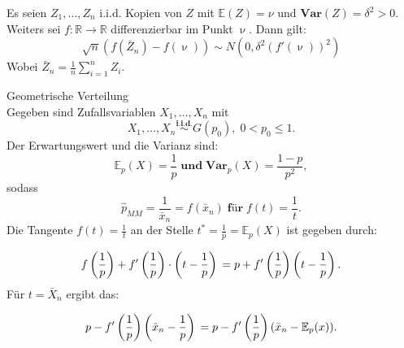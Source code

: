 \documentclass[10pt]{article}
\newcommand{\FZV}{X_1, \ldots, X_n} %
\newcommand{\IR}{\mathbb{R}} %
\newcommand{\EW}{\mathbb{E}} %
\newenvironment{BSP}[1][]
{\begin{Beispiel}[frametitle=#1]}{\end{Beispiel}}
\begin{document}
	Es seien $Z_1, \ldots, Z_n$ i.i.d. Kopien von $Z$ mit $\EW(Z)=\nu$ und $\textbf{Var}(Z)=\delta^2 > 0$. Weiters sei $f: \IR \rightarrow \IR$ differenzierbar im Punkt $\upnu$. Dann gilt:
	\begin{equation*}
		\sqrt{n} (f(\bar{Z}_n)-f(\upnu)) \sim N(0, \delta^2 (f'(\upnu))^2)
	\end{equation*}
	Wobei $\bar{Z}_n =  \frac{1}{n}\sum_{i=1}^{n} Z_i$.
	\begin{BSP}[Beispiel 1.3.5 (Delta-Methode)]
		
		Geometrische Verteilung \\
		Gegeben sind Zufallsvariablen $\FZV$ mit
		\begin{equation*}
			\FZV \overset{\textbf{i.i.d.}}{\sim} G(p_0), \; 0 < p_0 \leq 1.
		\end{equation*} 
		Der Erwartungswert und die Varianz sind:
		\begin{equation*}
			\EW_p(X) = \frac{1}{p} \; \textbf{und} \;  \textbf{Var}_p(X) = \frac{1-p}{p^2},
		\end{equation*}
		sodass
		\begin{equation*}
			\hat{p}_{MM} = \frac{1}{\bar{x}_n} = f(\bar{x}_n) \; \textbf{für} \; f(t)= \frac{1}{t}.
		\end{equation*} 
		Die Tangente $f(t) = \frac{1}{t}$ an der Stelle $t^* = \frac{1}{p} = \EW_p(X)$ ist gegeben durch:
		
		\begin{equation*}
			f\left(\frac{1}{p}\right) + f'\left(\frac{1}{p}\right) \cdot \left(t-\frac{1}{p}\right)\\
			= p + f'\left(\frac{1}{p}\right) \left(t-\frac{1}{p}\right).
		\end{equation*}
		Für $t=\bar{X}_n$ ergibt das:
		
		\begin{equation*}
			p - f'\left(\frac{1}{p}\right) \left(\bar{x}_n - \frac{1}{p}\right) \\
			= p - f'\left(\frac{1}{p}\right) (\bar{x}_n - \EW_p(x)).
		\end{equation*}
		
	\end{BSP}
	
\end{document}
